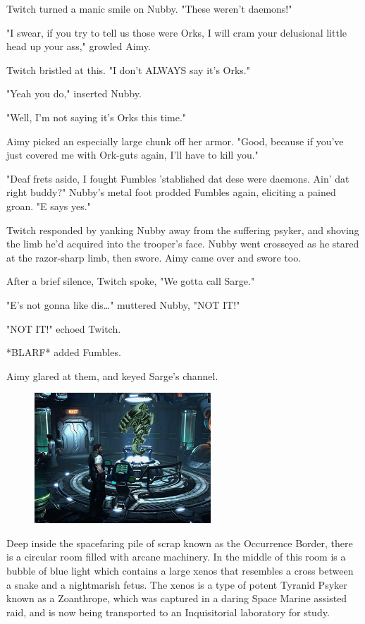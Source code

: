 Twitch turned a manic smile on Nubby. 
"These weren't daemons!"

"I swear, if you try to tell us those were Orks, I will cram your delusional little head up your ass," growled Aimy. 


Twitch bristled at this. 
"I don't ALWAYS say it's Orks."

"Yeah you do," inserted Nubby.

"Well, I'm not saying it's Orks this time."

Aimy picked an especially large chunk off her armor. 
"Good, because if you've just covered me with Ork-guts again, I'll have to kill you."

"Deaf frets aside, I fought Fumbles 'stablished dat dese were daemons. 
Ain' dat right buddy?" Nubby's metal foot prodded Fumbles again, eliciting a pained groan. 
"E says yes."

Twitch responded by yanking Nubby away from the suffering psyker, and shoving the limb he'd acquired into the trooper's face. 
Nubby went crosseyed as he stared at the razor-sharp limb, then swore. 
Aimy came over and swore too.

After a brief silence, Twitch spoke, "We gotta call Sarge."

"E's not gonna like dis…" muttered Nubby, "NOT IT!" 

"NOT IT!" echoed Twitch.

*BLARF* added Fumbles.

Aimy glared at them, and keyed Sarge's channel.

\begin{figure}
	\begin{center}
		\includegraphics[width=\figwidth]{pics/13/6.png}
	\end{center}
\end{figure}

Deep inside the spacefaring pile of scrap known as the Occurrence Border, there is a circular room filled with arcane machinery. 
In the middle of this room is a bubble of blue light which contains a large xenos that resembles a cross between a snake and a nightmarish fetus. 
The xenos is a type of potent Tyranid Psyker known as a Zoanthrope, which was captured in a daring Space Marine assisted raid, and is now being transported to an Inquisitorial laboratory for study.

